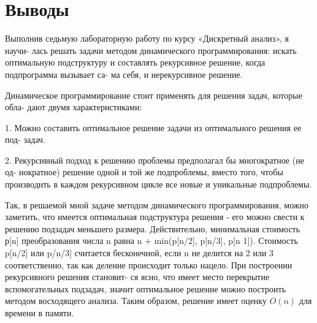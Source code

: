 \section{Выводы}

Выполнив седьмую лабораторную работу по курсу «Дискретный анализ», я научи-
лась решать задачи методом динамического программирования: искать оптимальную
подструктуру и составлять рекурсивное решение, когда подпрограмма вызывает са-
ма себя, и нерекурсивное решение.\newline

Динамическое программирование стоит применять для решения задач, которые обла-
дают двумя характеристиками:\newline

1. Можно составить оптимальное решение задачи из оптимального решения ее под-
задач.\newline

2. Рекурсивный подход к решению проблемы предполагал бы многократное (не од-
нократное) решение одной и той же подпроблемы, вместо того, чтобы производить
в каждом рекурсивном цикле все новые и уникальные подпроблемы.\newline

Так, в решаемой мной задаче методом динамического программирования, можно
заметить, что имеется оптимальная подструктура решения - его можно свести к
решению подзадач меньшего размера. Действительно, минимальная стоимость р[n]
преобразования числа n равна n + min(p[n/2], p[n/3], p[n 1]). Стоимость p[n/2] или
p/n/3] считается бесконечной, если n не делится на 2 или 3 соответственно, так как
деление происходит только нацело. При построении рекурсивного решения становит-
ся ясно, что имеет место перекрытие вспомогательных подзадач, значит оптимальное
решение можно построить методом восходящего анализа. Таким образом, решение
имеет оценку $O(n)$ для времени в памяти.\newline

